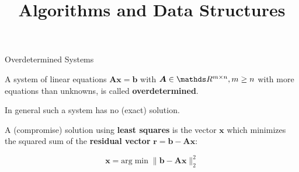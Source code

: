 \documentclass[11pt,compress,t,notes=noshow, xcolor=table]{beamer}
\title{Algorithms and Data Structures}
\begin{document}

\begin{vbframe}{Overdetermined Systems}

A system of linear equations $\bm{Ax} = \bm{b}$ with $\bm{A} \in \R^{m\times n}, m \ge n$ with more equations than unknowns, is called \textbf{overdetermined}.

\lz

In general such a system has no (exact) solution.

\lz

A (compromise) solution using \textbf{least squares} is the vector $\bm{x}$ which minimizes the squared sum of the \textbf{residual vector} $\bm{r} = \mathbf{b} - \mathbf{A}\boldsymbol{x}$:

$$
\bm{x} = \text{arg} \min \|\mathbf{b} - \mathbf{A}\boldsymbol{x}\|^2_2
$$

\end{vbframe}
\end{document}
